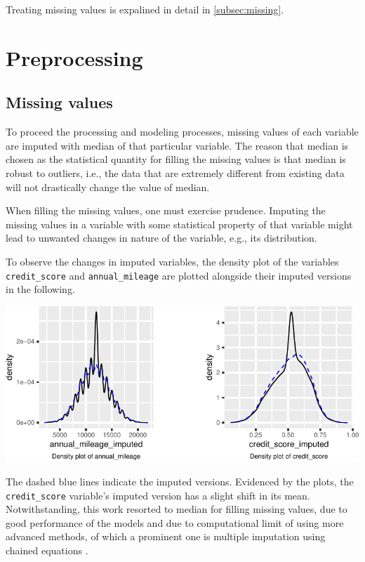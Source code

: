 \documentclass{article}
\begin{document}
Treating missing values is expalined in detail in \ref{subsec:missing}.

\hypertarget{preprocessing}{%
\section{\texorpdfstring{Preprocessing
\label{sec:process}}{Preprocessing }}\label{preprocessing}}

\hypertarget{missing-values}{%
\subsection{\texorpdfstring{Missing values
\label{subsec:missing}}{Missing values }}\label{missing-values}}

To proceed the processing and modeling processes, missing values of each
variable are imputed with median of that particular variable. The reason
that median is chosen as the statistical quantity for filling the
missing values is that median is robust to outliers, i.e., the data that
are extremely different from existing data will not drastically change
the value of median.

When filling the missing values, one must exercise prudence. Imputing
the missing values in a variable with some statistical property of that
variable might lead to unwanted changes in nature of the variable, e.g.,
its distribution.

To observe the changes in imputed variables, the density plot of the
variables \texttt{credit\_score} and \texttt{annual\_mileage} are
plotted alongside their imputed versions in the following.

\begin{center}\includegraphics{report_files/figure-latex/unnamed-chunk-7-1} \end{center}

The dashed blue lines indicate the imputed versions. Evidenced by the
plots, the \texttt{credit\_score} variable's imputed version has a
slight shift in its mean. Notwithstanding, this work resorted to median
for filling missing values, due to good performance of the models and
due to computational limit of using more advanced methods, of which a
prominent one is multiple imputation using chained equations
\cite{mice}.
\end{document}
